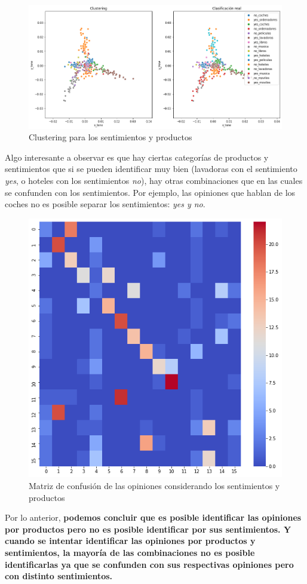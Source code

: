 \documentclass[paper=letter, fontsize=11pt]{scrartcl}
\numberwithin{equation}{section} %
\numberwithin{figure}{section} %
\numberwithin{table}{section} %
\begin{document}
\begin{figure}[H]
    \centering
    \includegraphics[scale=0.5]{figure/BOW_productos_sentimientos_2D.png}
    \caption{Clustering para los sentimientos y productos}
    \label{fig:BOW_productos_sentimientos_2D}
\end{figure}
Algo interesante a observar es que hay ciertas categorías de productos y sentimientos que si se pueden identificar muy bien (lavadoras con el sentimiento \textit{yes}, o hoteles con los sentimientos \textit{no}), hay otras combinaciones que en las cuales se confunden con los sentimientos. Por ejemplo, las opiniones que hablan de los coches no es posible separar los sentimientos: \textit{yes y no}.
\begin{figure}[H]
    \centering
    \includegraphics[scale=0.3]{figure/heatmap_productos_sentimientos.png}
    \caption{Matriz de confusión de las opiniones considerando los sentimientos y productos}
    \label{fig:my_label}
\end{figure}
Por lo anterior, \textbf{podemos concluir que es posible identificar las opiniones por productos pero no es posible identificar por sus sentimientos. Y cuando se intentar identificar las opiniones por productos y sentimientos, la mayoría de las combinaciones no es posible identificarlas ya que se confunden con sus respectivas opiniones pero con distinto sentimientos.}
\end{document}
